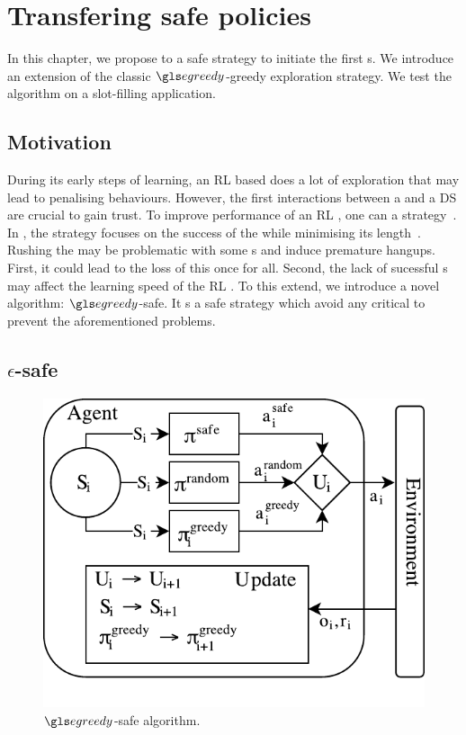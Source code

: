 \chapter{Transfering safe policies}
\label{chapter:slsp}

In this chapter, we propose to  a safe strategy to initiate the first s. We introduce an extension of the classic $\egreedy$-greedy exploration strategy. We test the algorithm on a slot-filling application.

\section{Motivation}

During its early steps of learning, an \gls{RL} based   does a lot of exploration that may lead to penalising behaviours. However, the first interactions between a  and a \gls{DS} are crucial to gain trust. To improve  performance of an \gls{RL} , one can  a strategy~\parencite{taylor2009transfer,LazaricSurvey}. In , the strategy focuses on the success of the  while minimising its length~\parencite{Chandramohan2010,Casanueva2015,Genevay2016}. Rushing the  may be problematic with some s and induce premature  hangups. First, it could lead to the loss of this  once for all. Second, the lack of sucessful s may affect the learning speed of the \gls{RL} . To this extend, we introduce a novel algorithm: $\egreedy$-safe. It s a safe strategy which avoid any critical  to prevent the aforementioned problems.


\section{\texorpdfstring{$\epsilon$}{E}-safe}

\begin{figure}
    \centering
    \includegraphics[width=0.6\columnwidth]{sources/contribution/slsp/transfer7}
    \caption{$\egreedy$-safe algorithm.} %
    \label{fig:qlearning}
\end{figure}


